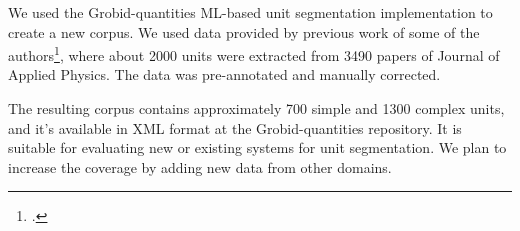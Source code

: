 \documentclass[a4paper,11pt]{article}
\begin{document}
We used the Grobid-quantities ML-based unit segmentation implementation to create a new corpus. We used data provided by previous work of some of the authors\footcite{suzuki2018constructing}, where about 2000 units were extracted from 3490 papers of Journal of Applied Physics. The data was pre-annotated and manually corrected. 

The resulting corpus contains approximately 700 simple and 1300 complex units, and it's available in XML format at the Grobid-quantities repository\footnotemark[3]. It is suitable for evaluating new or existing systems for unit segmentation. We plan to increase the coverage by adding new data from other domains.
\end{document}
